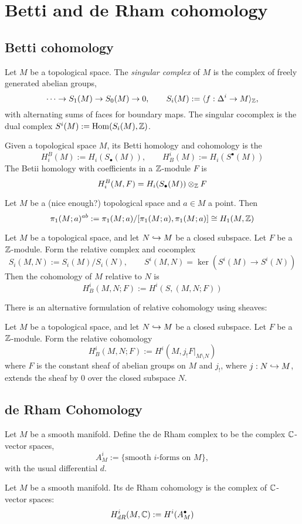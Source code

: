 \section{Betti and de Rham cohomology}
\subsection{Betti cohomology}
\begin{defn}
Let $M$ be a topological space. The \emph{singular complex} of $M$ is the complex of freely generated abelian groups,
\[
\cdots \to S_1(M) \to S_0(M) \to 0, \qquad S_i(M) := \langle f : \Delta^i \to M \rangle_{\mathbb{Z}},
\]
with alternating sums of faces for boundary maps. The singular cocomplex is the dual complex $S^i(M) := \mathrm{Hom}(S_i(M), \mathbb{Z})$.
\end{defn}
\begin{defn}\label{def:betti}
Given a topological space $M$, its Betti homology and cohomology is the 
\[
H^B_i(M) := H_i(S_{\bullet}(M)), \qquad H_B^i(M) := H_i(S^{\bullet}(M))
\]
The Betii homology with coefficients in a $\mathbb{Z}$-module $F$ is
\[
H^B_i(M, F) = H_i(S_{\bullet}(M)) \otimes_{\mathbb{Z}} F
\]
\end{defn}
\begin{prop}
Let $M$ be a (nice enough?) topological space and $a \in M$ a point. Then
\[
\pi_1(M;a)^{ab} := \pi_1(M;a) / [\pi_1(M;a), \pi_1(M;a)] \cong H_1(M, \mathbb{Z})
\]
\end{prop}
\begin{defn}
Let $M$ be a topological space, and let $N \hookrightarrow M$ be a closed subspace. Let $F$ be a $\mathbb{Z}$-module. Form the relative complex and cocomplex
\[
S_i(M,N) := S_i(M) / S_i(N), \qquad S^i(M,N) = \ker (S^i(M) \to S^i(N))
\]
Then the cohomology of $M$ relative to $N$ is
\[
H^i_B(M,N;F) := H^i(S,(M,N;F))
\]
\end{defn}
There is an alternative formulation of relative cohomology using sheaves:
\begin{defn}
Let $M$ be a topological space, and let $N \hookrightarrow M$ be a closed subspace. Let $F$ be a $\mathbb{Z}$-module. Form the relative cohomology
\[
H^i_B(M,N;F) := H^i(M,j_{!}F|_{M \setminus N})
\]
where $F$ is the constant sheaf of abelian groups on $M$ and $j_{!}$, where $j : N \hookrightarrow M$, extends the sheaf by 0 over the closed subspace $N$.
\end{defn}

\subsection{de Rham Cohomology}
\begin{defn}\label{def:derham}
Let $M$ be a smooth manifold. Define the de Rham complex to be the complex $\mathbb{C}$-vector spaces,
\[
A^i_M := \{ \textrm{smooth $i$-forms on $M$} \},
\]
with the usual differential $d$.
\end{defn}
\begin{defn}
Let $M$ be a smooth manifold. Its de Rham cohomology is the complex of $\mathbb{C}$-vector spaces:
\[
H^i_{dR}(M, \mathbb{C}) := H^i(A^{\bullet}_M)
\]
\end{defn}

